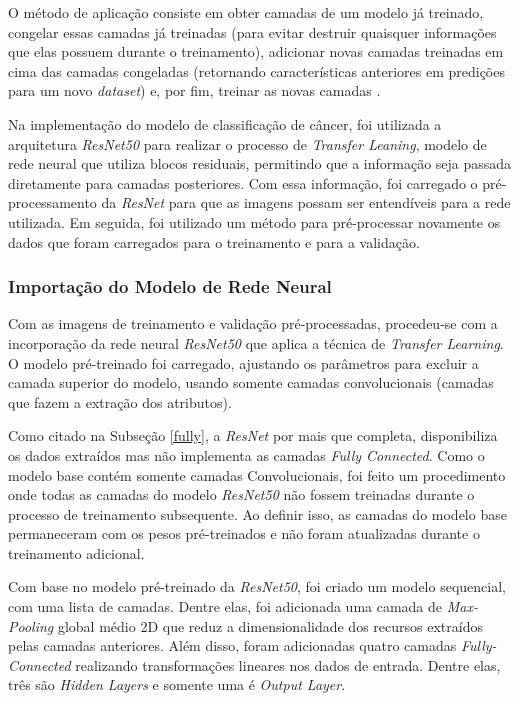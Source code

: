 O método de aplicação consiste em obter camadas de um modelo já treinado, congelar essas camadas já treinadas (para evitar destruir quaisquer informações que elas possuem durante o treinamento), adicionar novas camadas treinadas em cima das camadas congeladas (retornando características anteriores em predições para um novo \textit{dataset}) e, por fim, treinar as novas camadas \cite{kerastransfer}.

Na implementação do modelo de classificação de câncer, foi utilizada a arquitetura \textit{ResNet50} para realizar o processo de \textit{Transfer Leaning}, modelo de rede neural que utiliza blocos residuais, permitindo que a informação seja passada diretamente para camadas posteriores. Com essa informação, foi carregado o pré-processamento da \textit{ResNet} para que as imagens possam ser entendíveis para a rede utilizada. Em seguida, foi utilizado um método para pré-processar novamente os dados que foram carregados para o treinamento e para a validação.



\subsubsection{\esp Importação do Modelo de Rede Neural} \label{camadas}

Com as imagens de treinamento e validação pré-processadas, procedeu-se com a incorporação da rede neural \textit{ResNet50} que aplica a técnica de \textit{Transfer Learning}. O modelo pré-treinado foi carregado, ajustando os parâmetros para excluir a camada superior do modelo, usando somente camadas convolucionais (camadas que fazem a extração dos atributos).

Como citado na Subseção \ref{fully}, a \textit{ResNet} por mais que completa, disponibiliza os dados extraídos mas não implementa as camadas \textit{Fully Connected}. Como o modelo base contém somente camadas Convolucionais, foi feito um procedimento onde todas as camadas do modelo \textit{ResNet50} não fossem treinadas durante o processo de treinamento subsequente. Ao definir isso, as camadas do modelo base permaneceram com os pesos pré-treinados e não foram atualizadas durante o treinamento adicional. 

Com base no modelo pré-treinado da \textit{ResNet50}, foi criado um modelo sequencial, com uma lista de camadas. Dentre elas, foi adicionada uma camada de \textit{Max-Pooling} global médio 2D que reduz a dimensionalidade dos recursos extraídos pelas camadas anteriores. Além disso, foram adicionadas quatro camadas \textit{Fully-Connected} realizando transformações lineares nos dados de entrada. Dentre elas, três são \textit{Hidden Layers} e somente uma é \textit{Output Layer}.

